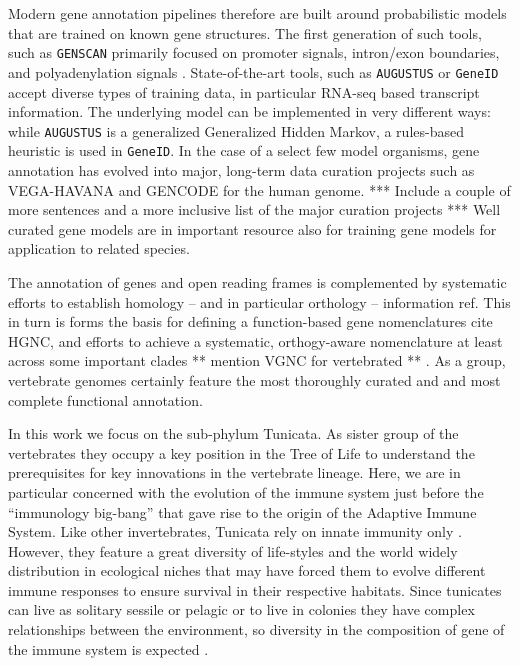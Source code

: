 \documentclass[11pt]{article}
\newcommand{\TODO}[1]{\begingroup\color{red}#1\endgroup}
\newcommand{\PFS}[1]{\begingroup\color{blue}#1\endgroup}
\begin{document}
\PFS{Modern gene annotation pipelines therefore are built around
  probabilistic models that are trained on known gene structures. The first
  generation of such tools, such as \texttt{GENSCAN} \cite{genescan}
  primarily focused on promoter signals, intron/exon boundaries, and
  polyadenylation signals \cite{claverie}. State-of-the-art tools, such as
  \texttt{AUGUSTUS} \cite{augustus} or \texttt{GeneID} \cite{Blanco:2007}
  accept diverse types of training data, in particular RNA-seq based
  transcript information. The underlying model can be implemented in very
  different ways: while \texttt{AUGUSTUS} is a generalized Generalized
  Hidden Markov, a rules-based heuristic is used in \texttt{GeneID}. In the
  case of a select few model organisms, gene annotation has evolved into
  major, long-term data curation projects such as VEGA-HAVANA and GENCODE
  for the human genome. \TODO{*** Include a couple of more sentences and a
    more inclusive list of the major curation projects ***} Well curated
  gene models are in important resource also for training gene models for
  application to related species.}

\PFS{The annotation of genes and open reading frames is complemented by
  systematic efforts to establish homology -- and in particular orthology
  -- information \TODO{ref}. This in turn is forms the basis for defining a
  function-based gene nomenclatures \TODO{cite HGNC}, and efforts to
  achieve a systematic, orthogy-aware nomenclature at least across some
  important clades \TODO{** mention VGNC for vertebrated **}
  \cite{aken2016ensembl} \cite{birney2004overview}. As a group, vertebrate
  genomes certainly feature the most thoroughly curated and and most
  complete functional annotation.}

In this work we focus on the sub-phylum Tunicata. As sister group of the
vertebrates they occupy a key position in the Tree of Life to understand
the prerequisites for key innovations in the vertebrate lineage. Here, we
are in particular concerned with the evolution of the immune system just
before the ``immunology big-bang'' \cite{bernstein1996} that gave rise to
the origin of the Adaptive Immune System. Like other invertebrates,
Tunicata rely on innate immunity only \cite{franchi2017}. However, they
feature a great diversity of life-styles and the world widely distribution
in ecological niches that may have forced them to evolve different immune
responses to ensure survival in their respective habitats. Since tunicates
can live as solitary sessile or pelagic or to live in colonies they have
complex relationships between the environment, so diversity in the
composition of gene of the immune system is expected
\cite{carroll2008evo,berna2014evolutionary}.
\end{document}
